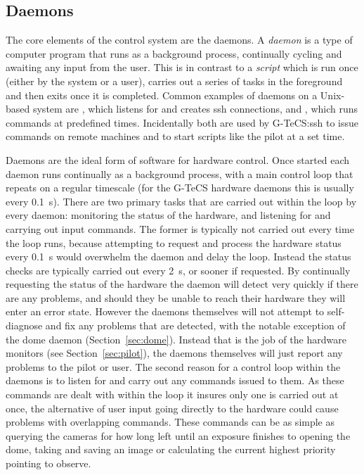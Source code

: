 \begin{colsection}
\begin{colsection}
\end{colsection}


\subsection{Daemons}
\label{sec:daemons}
\begin{colsection}

The core elements of the control system are the daemons. A \emph{daemon} is a type of computer program that runs as a background process, continually cycling and awaiting any input from the user. This is in contrast to a \emph{script} which is run once (either by the system or a user), carries out a series of tasks in the foreground and then exits once it is completed. Common examples of daemons on a Unix-based system are , which listens for and creates \gls{ssh} connections, and , which runs commands at predefined times. Incidentally both are used by G-TeCS:\@ \gls{ssh} to issue commands on remote machines and  to start scripts like the pilot at a set time.

Daemons are the ideal form of software for hardware control. Once started each daemon runs continually as a background process, with a main control loop that repeats on a regular timescale (for the G-TeCS hardware daemons this is usually every \SI{0.1}{\second}). There are two primary tasks that are carried out within the loop by every daemon: monitoring the status of the hardware, and listening for and carrying out input commands. The former is typically not carried out every time the loop runs, because attempting to request and process the hardware status every \SI{0.1}{\second} would overwhelm the daemon and delay the loop. Instead the status checks are typically carried out every \SI{2}{\second}, or sooner if requested. By continually requesting the status of the hardware the daemon will detect very quickly if there are any problems, and should they be unable to reach their hardware they will enter an error state. However the daemons themselves will not attempt to self-diagnose and fix any problems that are detected, with the notable exception of the dome daemon (Section~\ref{sec:dome}). Instead that is the job of the hardware monitors (see Section~\ref{sec:pilot}), the daemons themselves will just report any problems to the pilot or user. The second reason for a control loop within the daemons is to listen for and carry out any commands issued to them. As these commands are dealt with within the loop it insures only one is carried out at once, the alternative of user input going directly to the hardware could cause problems with overlapping commands. These commands can be as simple as querying the cameras for how long left until an exposure finishes to opening the dome, taking and saving an image or calculating the current highest priority pointing to observe.


\end{colsection}
\end{colsection}
